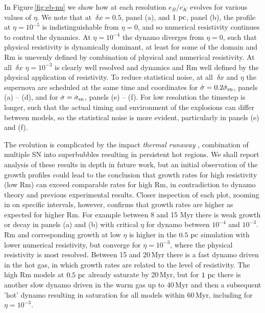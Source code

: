 \documentclass[preprint2]{aastex63}
\newcommand\SNr{\dot\sigma_{\rm sn}}
\newcommand\pc{~ {\rm pc}}
\newcommand\dx{~ {\delta x}}
\begin{document}
In Figure\,\ref{fig:eb-nu} we show how at each resolution $e_B/\overline{e_K}$
evolves for various values of $\eta$.
We note that at $\dx=0.5$, panel (a), and $1\pc$, panel (b), the profile
at $\eta=10^{-5}$ is indistinguishable from $\eta=0$, and so numerical
resistivity continues to control the dynamics.
At $\eta=10^{-4}$ the dynamo diverges from $\eta=0$, such that physical resistivity
is dynamically dominant, at least for some of the domain and Rm is unevenly
defined by combination of physical and numerical resistivity.
At all $\dx$ $\eta=10^{-3}$ is clearly well resolved and dynamics and
Rm well defined by the physical application of resistivity.
To reduce statistical noise, at all $\dx$ and $\eta$ the supernova are
scheduled at the same time and coordinates for $\dot\sigma=0.2\SNr$,
panels (a) -- (d), and for $\dot\sigma=\SNr$, panels (e) -- (f).
For low resolution the timestep is longer, such that the actual timing and 
environment of the explosions can differ between models, so the statistical
noise is more evident, particularly in panels (e) and (f). 

The evolution is complicated by the impact \emph{thermal runaway}
\citep[see e.g.,][]{LOCBN15}, combination of multiple SN into superbubbles
resulting in persistent hot regions.
We shall report analysis of these results in depth in future work, but an 
initial observation of the growth profiles could lead to the conclusion that
growth rates for high resistivity (low Rm) can exceed comparable rates for high
Rm, in contradiction to dynamo theory and previous experimental results.
Closer inspection of each plot, zooming in on specific intervals, however,
confirms that growth rates are higher as expected for higher Rm.
For example between 8 and 15 Myr there is weak growth or decay in panels (a)
and (b) with critical $\eta$ for dynamo between $10^{-4}$ and $10^{-3}$.
Rm and corresponding growth at low $\eta$ is higher in the $0.5\pc$ simulation
with lower numerical resistivity, but 
converge for $\eta=10^{-3}$, where the physical resistivity is most resolved.
Between 15 and 20\,Myr there is a fast dynamo driven in the hot gas, in which
growth rates are related to the level of resistivity.
The high Rm models at $0.5\pc$ already saturate by 20\,Myr, but for $1\pc$ there
is another slow dynamo driven in the warm gas up to 40\,Myr and then a
subsequent 'hot' dynamo resulting in saturation for all models within 60\,Myr,
including for $\eta=10^{-3}$.
\end{document}
